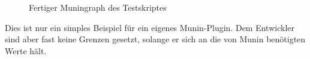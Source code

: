 \begin{figure}[ht]
	\centering
		\caption{Fertiger Muningraph des Testskriptes}
		\label{du-graph}
\end{figure}

Dies ist nur ein simples Beispiel für ein eigenes Munin-Plugin.
Dem Entwickler sind aber fast keine Grenzen gesetzt, solange er sich an die von Munin benötigten Werte hält.